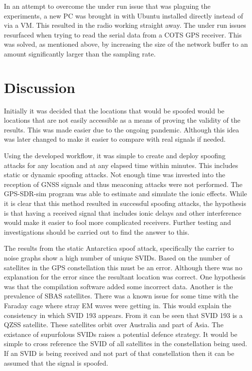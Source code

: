 In an attempt to overcome the under run issue that was plaguing the experiments, a new PC was brought in with Ubuntu installed directly instead of via a VM. This resulted
in the radio working straight away. The under run issues resurfaced when trying to read the serial data from a COTS GPS receiver. This was solved, as mentioned above, by
increasing the size of the network buffer to an amount significantly larger than the sampling rate.

\section{Discussion}
Initially it was decided that the locations that would be spoofed would be locations that are not easily accessible as a means of proving the validity of the results.
This was made easier due to the ongoing pandemic. Although this idea was later changed to make it easier to compare with real signals if needed.

Using the developed workflow, it was simple to create and deploy spoofing attacks for any location and at any elapsed time within minutes. This includes static or dynamic
spoofing attacks. Not enough time was invested into the reception of GNSS signals and thus meaconing attacks were not performed. The GPS-SDR-sim program was able to
estimate and simulate the ionic effects. While it is clear that this method resulted in successful spoofing attacks, the hypothesis is that having a received signal that includes ionic delays
and other interference would make it easier to fool more complicated receivers. Further testing and investigations should be carried out to find the answer to this. 

The results from the static Antarctica spoof attack, specifically the carrier to noise graphs show a high number of unique SVIDs. Based on the number of satellites in the
GPS constellation this must be an error. Although there was no explanation for the error since the resultant location was correct. One hypothesis was that the compilation
software added some incorrect data. Another is the prevalence of SBAS satellites. There was a known issue for some time with the Faraday cage where stray EM waves were
getting in. This would explain the consistency in which SVID 193 appears. From \cite{RN67} it can be seen that SVID 193 is a QZSS satellite. These satellites orbit over
Australia and part of Asia. The existance of supurfolous SVIDs raises a potential defence strategy. It would be simple to cross reference the SVID of all satellites in
the constellation being used. If an SVID is being received and not part of that constellation then it can be assumed that the signal is spoofed. 

